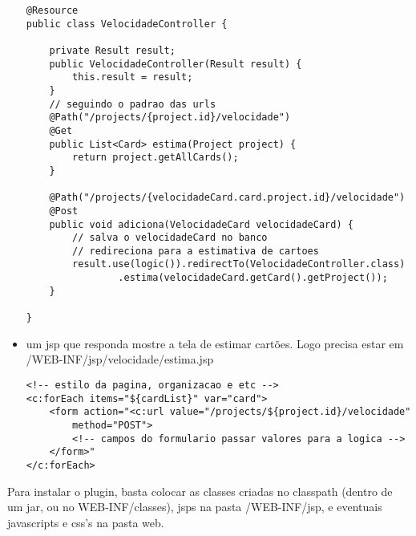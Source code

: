 \begin{itemize}
{\begin{lstlisting}
@Resource
public class VelocidadeController {
	
	private Result result;
	public VelocidadeController(Result result) {
		this.result = result;
	}
	// seguindo o padrao das urls
	@Path("/projects/{project.id}/velocidade")
	@Get
	public List<Card> estima(Project project) {
		return project.getAllCards();
	}

	@Path("/projects/{velocidadeCard.card.project.id}/velocidade")
	@Post
	public void adiciona(VelocidadeCard velocidadeCard) {
		// salva o velocidadeCard no banco
		// redireciona para a estimativa de cartoes
		result.use(logic()).redirectTo(VelocidadeController.class)
				.estima(velocidadeCard.getCard().getProject());
	}
	
}
		\end{lstlisting}
	}
	
	\item{um jsp que responda mostre a tela de estimar cartões. Logo precisa estar em /WEB-INF/jsp/velocidade/estima.jsp
	
		\begin{lstlisting}
<!-- estilo da pagina, organizacao e etc -->
<c:forEach items="${cardList}" var="card">
	<form action="<c:url value="/projects/${project.id}/velocidade" 
		method="POST">
		<!-- campos do formulario passar valores para a logica -->
	</form>"
</c:forEach>
		\end{lstlisting}
	}
\end{itemize}

Para instalar o plugin, basta colocar as classes criadas no classpath (dentro de um jar, ou no WEB-INF/classes), jsps na pasta /WEB-INF/jsp, e eventuais javascripts e css's na pasta web.


